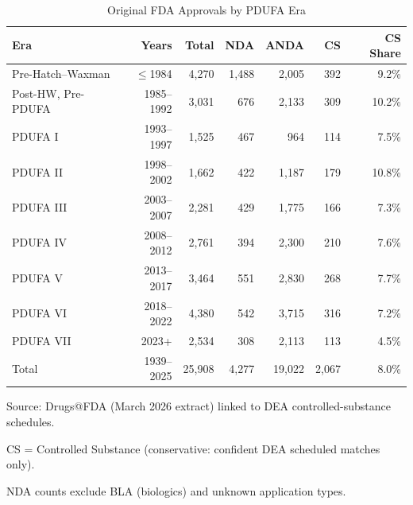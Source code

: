 \begin{table}[htbp]
\centering
\begin{threeparttable}
\caption{Original FDA Approvals by PDUFA Era}
\label{tab:era_summary}
\small
\begin{tabular}{lrrrrrr}
\toprule
Era & Years & Total & NDA & ANDA & CS & CS Share \\
\midrule
Pre-Hatch--Waxman & $\leq$1984 & 4,270 & 1,488 & 2,005 & 392 & 9.2\% \\
Post-HW, Pre-PDUFA & 1985--1992 & 3,031 & 676 & 2,133 & 309 & 10.2\% \\
PDUFA I & 1993--1997 & 1,525 & 467 & 964 & 114 & 7.5\% \\
PDUFA II & 1998--2002 & 1,662 & 422 & 1,187 & 179 & 10.8\% \\
PDUFA III & 2003--2007 & 2,281 & 429 & 1,775 & 166 & 7.3\% \\
PDUFA IV & 2008--2012 & 2,761 & 394 & 2,300 & 210 & 7.6\% \\
PDUFA V & 2013--2017 & 3,464 & 551 & 2,830 & 268 & 7.7\% \\
PDUFA VI & 2018--2022 & 4,380 & 542 & 3,715 & 316 & 7.2\% \\
PDUFA VII & 2023+ & 2,534 & 308 & 2,113 & 113 & 4.5\% \\
\midrule
Total & 1939--2025 & 25,908 & 4,277 & 19,022 & 2,067 & 8.0\% \\
\bottomrule
\end{tabular}
\begin{tablenotes}
\footnotesize
\item Source: Drugs@FDA (March 2026 extract) linked to DEA controlled-substance schedules.
\item CS = Controlled Substance (conservative: confident DEA scheduled matches only).
\item NDA counts exclude BLA (biologics) and unknown application types.
\end{tablenotes}
\end{threeparttable}
\end{table}

